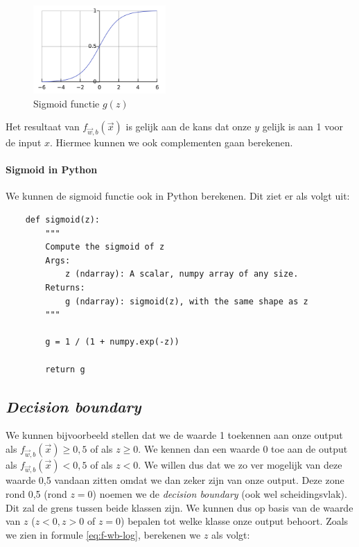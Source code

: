 \begin{figure}[h]
	\centering
	\includegraphics[width=0.45\textwidth]{images/9-sigmoid-function.png}
	\caption{Sigmoid functie $g(z)$}
	\label{fig:sigmoid}
\end{figure}
\newpage
\noindent
Het resultaat van $f_{\vec{w},b}(\vec{x})$ is gelijk aan de kans dat onze $y$ gelijk is aan 1 voor de input $x$. Hiermee kunnen we ook complementen gaan berekenen. 

\paragraph{Sigmoid in Python}

We kunnen de sigmoid functie ook in Python berekenen. Dit ziet er als volgt uit:
\begin{lstlisting}
	def sigmoid(z):
	    """
	    Compute the sigmoid of z
	    Args:
	        z (ndarray): A scalar, numpy array of any size.
	    Returns:
	        g (ndarray): sigmoid(z), with the same shape as z
	    """
	
	    g = 1 / (1 + numpy.exp(-z))
	
	    return g
\end{lstlisting}
\subsection{\textit{Decision boundary}}

We kunnen bijvoorbeeld stellen dat we de waarde 1 toekennen aan onze output als $f_{\vec{w},b}(\vec{x}) \geq 0,5$ of als $z \geq 0$. We kennen dan een waarde 0 toe aan de output als $f_{\vec{w},b}(\vec{x}) < 0,5$ of als $z < 0$. We willen dus dat we zo ver mogelijk van deze waarde 0,5 vandaan zitten omdat we dan zeker zijn van onze output. Deze zone rond 0,5 (rond $z = 0$) noemen we de \textit{decision boundary} (ook wel scheidingsvlak). Dit zal de grens tussen beide klassen zijn. We kunnen dus op basis van de waarde van $z$ ($z < 0, z > 0$ of $z = 0$) bepalen tot welke klasse onze output behoort. Zoals we zien in formule \ref{eq:f-wb-log}, berekenen we $z$ als volgt:

